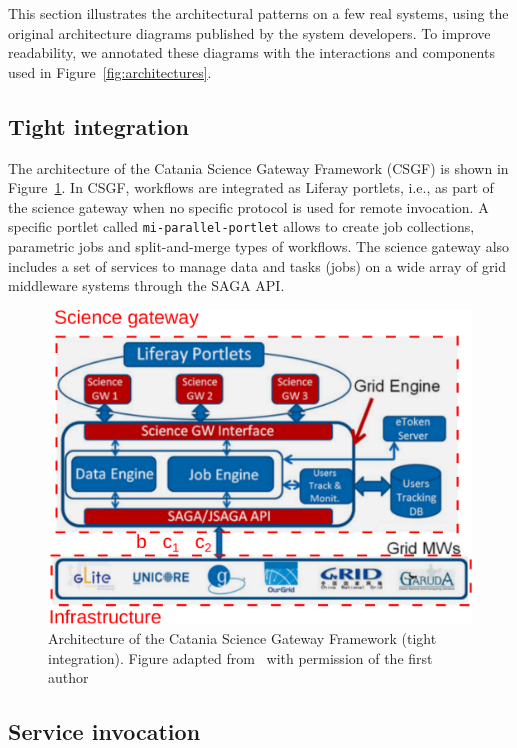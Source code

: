 \documentclass[preprint,3p,twocolumn]{elsarticle}
\newcommand{\todo}[2]{\pdfmargincomment[color=red,author=#1,open=true]{#2}}
\newcommand{\correction}[1]{\color{blue}#1\color{black}\xspace}
\begin{document}
\correction{This section illustrates the architectural patterns on a
  few real systems, using the original architecture diagrams published
  by the system developers. To improve readability, we annotated these
  diagrams with the interactions and components used in
  Figure~\ref{fig:architectures}.

\subsection{Tight integration}

The architecture of the Catania Science Gateway Framework (CSGF) is
shown in Figure~\ref{fig:csgf}. In CSGF, workflows are integrated as
Liferay portlets, i.e., as part of the science gateway when no
specific protocol is used for remote invocation. A specific portlet
called \texttt{mi-parallel-portlet} allows to create job collections,
parametric jobs and split-and-merge types of workflows. The science
gateway also includes a set of services to manage data and tasks
(jobs) on a wide array of grid middleware systems through the SAGA
API.
\begin{figure}
\centering
\includegraphics[width=\columnwidth]{figures/CSGF}
\caption{\correction{Architecture of the Catania Science Gateway Framework (tight
  integration). Figure adapted from~\cite{ardizzone2012decide} with
  permission of the first author} \todo{approval still pending}.}
\label{fig:csgf}
\end{figure}

\subsection{Service invocation}

}
\end{document}

